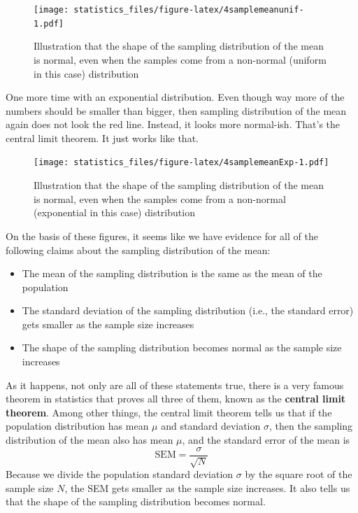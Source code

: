 \documentclass[]{book}
\begin{document}
\begin{figure}
\centering
\texttt{[image: statistics\_files/figure-latex/4samplemeanunif-1.pdf]}
\caption{\label{fig:4samplemeanunif}Illustration that the shape of the sampling distribution of the mean is normal, even when the samples come from a non-normal (uniform in this case) distribution}
\end{figure}

One more time with an exponential distribution. Even though way more of the numbers should be smaller than bigger, then sampling distribution of the mean again does not look the red line. Instead, it looks more normal-ish. That's the central limit theorem. It just works like that.

\begin{figure}
\centering
\texttt{[image: statistics\_files/figure-latex/4samplemeanExp-1.pdf]}
\caption{\label{fig:4samplemeanExp}Illustration that the shape of the sampling distribution of the mean is normal, even when the samples come from a non-normal (exponential in this case) distribution}
\end{figure}

On the basis of these figures, it seems like we have evidence for all of the following claims about the sampling distribution of the mean:

\begin{itemize}
\item
  The mean of the sampling distribution is the same as the mean of the population
\item
  The standard deviation of the sampling distribution (i.e., the standard error) gets smaller as the sample size increases
\item
  The shape of the sampling distribution becomes normal as the sample size increases
\end{itemize}

As it happens, not only are all of these statements true, there is a very famous theorem in statistics that proves all three of them, known as the \textbf{central limit theorem}. Among other things, the central limit theorem tells us that if the population distribution has mean \(\mu\) and standard deviation \(\sigma\), then the sampling distribution of the mean also has mean \(\mu\), and the standard error of the mean is \[\mbox{SEM} = \frac{\sigma}{ \sqrt{N} }\] Because we divide the population standard deviation \(\sigma\) by the square root of the sample size \(N\), the SEM gets smaller as the sample size increases. It also tells us that the shape of the sampling distribution becomes normal.
\end{document}

